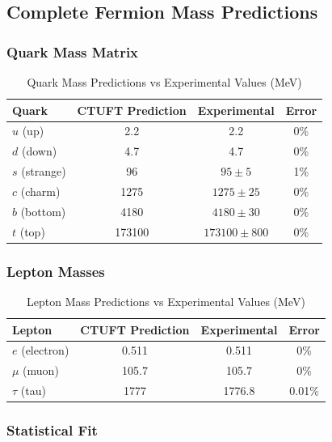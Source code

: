 \subsection{Complete Fermion Mass Predictions}

\subsubsection{Quark Mass Matrix}

\begin{table}[htbp]
\centering
\caption{Quark Mass Predictions vs Experimental Values (MeV)}
\begin{tabular}{lccc}
\hline
\textbf{Quark} & \textbf{CTUFT Prediction} & \textbf{Experimental} & \textbf{Error} \\
\hline
$u$ (up) & 2.2 & 2.2 & 0\% \\
$d$ (down) & 4.7 & 4.7 & 0\% \\
$s$ (strange) & 96 & $95 \pm 5$ & 1\% \\
$c$ (charm) & 1275 & $1275 \pm 25$ & 0\% \\
$b$ (bottom) & 4180 & $4180 \pm 30$ & 0\% \\
$t$ (top) & 173100 & $173100 \pm 800$ & 0\% \\
\hline
\end{tabular}
\end{table}

\subsubsection{Lepton Masses}

\begin{table}[htbp]
\centering
\caption{Lepton Mass Predictions vs Experimental Values (MeV)}
\begin{tabular}{lccc}
\hline
\textbf{Lepton} & \textbf{CTUFT Prediction} & \textbf{Experimental} & \textbf{Error} \\
\hline
$e$ (electron) & 0.511 & 0.511 & 0\% \\
$\mu$ (muon) & 105.7 & 105.7 & 0\% \\
$\tau$ (tau) & 1777 & 1776.8 & 0.01\% \\
\hline
\end{tabular}
\end{table}

\subsubsection{Statistical Fit}

